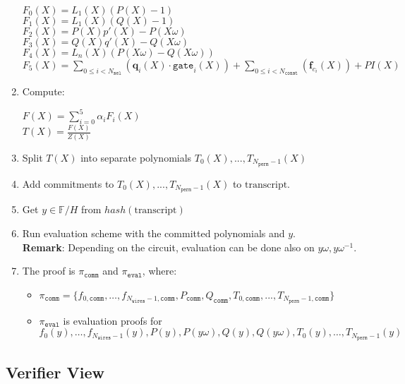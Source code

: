\begin{enumerate}
    \begin{center}
        $F_0(X) = L_1(X)(P(X) - 1)$\\
        $F_1(X) = L_1(X)(Q(X) - 1)$ \\
        $F_2(X) = P(X)p'(X) - P(X\omega)$ \\
        $F_3(X) = Q(X)q'(X) - Q(X\omega)$ \\
        $F_4(X) = L_n(X)(P(X\omega) - Q(X\omega))$ \\
        $F_5(X) = \sum\limits_{0 \leq i < N_{\texttt{sel}}} (\textbf{q}_{i}(X) \cdot \texttt{gate}_i(X))
        + \sum\limits_{0 \leq i < N_{\texttt{const}}}(\textbf{f}_{c_i}(X)) + PI(X)$
    \end{center}
    \item Compute:
    \begin{center}
        $F(X) = \sum\limits_{i = 0}^5 \alpha_iF_i(X)$ \\
        $T(X) = \frac{F(X)}{Z(X)}$
    \end{center}
    \item Split $T(X)$ into separate polynomials $T_0(X), ..., T_{N_{\texttt{perm}} - 1}(X)$
    \item Add commitments to $T_0(X), ..., T_{N_{\texttt{perm}} - 1}(X)$ to $\text{transcript}$.
    \item Get $y \in \mathbb{F}/H$ from $hash(\text{transcript})$
    \item Run evaluation scheme with the committed polynomials and $y$. \\
    \textbf{Remark}: Depending on the circuit, evaluation can be done also on $y\omega, y\omega^{-1}$.
    \item The proof is $\pi_{\texttt{comm}}$ and $\pi_{\texttt{eval}}$, where:
    \begin{itemize}
        \item $\pi_{\texttt{comm}} = \{f_{0, \texttt{comm}}, \dots, f_{N_{\texttt{wires}} - 1, \texttt{comm}},
        P_{\texttt{comm}}, Q_{\texttt{comm}}, T_{0, \texttt{comm}}, ..., T_{N_{\texttt{perm}} - 1, \texttt{comm}} \}$
        \item  $\pi_{\texttt{eval}}$ is evaluation proofs for $f_0(y), \dots, f_{N_{\texttt{wires}} - 1}(y), P(y), P(y\omega), Q(y), Q(y\omega), T_0(y), \dots, T_{N_{\texttt{perm}} - 1}(y)$
    \end{itemize}
\end{enumerate}

\subsection{Verifier View}

